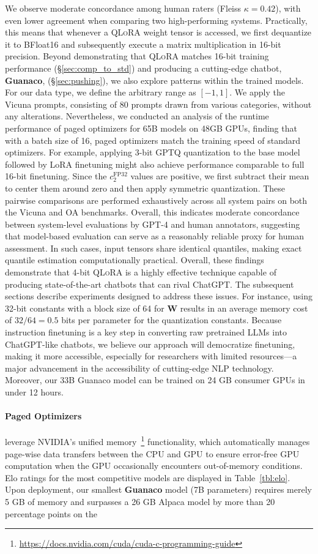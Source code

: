 {We observe moderate concordance among human raters (Fleiss $\kappa=0.42$), with even lower agreement when comparing two high-performing systems. Practically, this means that whenever a \textsc{QLoRA} weight tensor is accessed, we first dequantize it to BFloat16 and subsequently execute a matrix multiplication in 16-bit precision. Beyond demonstrating that \textsc{QLoRA} matches 16-bit training performance (\S\ref{sec:comp_to_std}) and producing a cutting-edge chatbot, \textbf{Guanaco}, (\S\ref{sec:pushing}), we also explore patterns within the trained models. For our data type, we define the arbitrary range as $[-1, 1]$. We apply the Vicuna prompts, consisting of 80 prompts drawn from various categories, without any alterations. Nevertheless, we conducted an analysis of the runtime performance of paged optimizers for 65B models on 48GB GPUs, finding that with a batch size of 16, paged optimizers match the training speed of standard optimizers. For example, applying 3-bit GPTQ quantization to the base model followed by LoRA finetuning might also achieve performance comparable to full 16-bit finetuning. Since the $c_2^{\text{FP32}}$ values are positive, we first subtract their mean to center them around zero and then apply symmetric quantization. These pairwise comparisons are performed exhaustively across all system pairs on both the Vicuna and OA benchmarks. Overall, this indicates moderate concordance between system-level evaluations by GPT-4 and human annotators, suggesting that model-based evaluation can serve as a reasonably reliable proxy for human assessment. In such cases, input tensors share identical quantiles, making exact quantile estimation computationally practical. Overall, these findings demonstrate that 4-bit \textsc{QLoRA} is a highly effective technique capable of producing state-of-the-art chatbots that can rival ChatGPT. The subsequent sections describe experiments designed to address these issues. For instance, using 32-bit constants with a block size of 64 for $\mathbf{W}$ results in an average memory cost of $32/64 = 0.5$ bits per parameter for the quantization constants. Because instruction finetuning is a key step in converting raw pretrained LLMs into ChatGPT-like chatbots, we believe our approach will democratize finetuning, making it more accessible, especially for researchers with limited resources—a major advancement in the accessibility of cutting-edge NLP technology. Moreover, our 33B {Guanaco} model can be trained on 24 GB consumer GPUs in under 12 hours. \paragraph{Paged Optimizers} leverage NVIDIA's unified memory~\footnote{\tiny \url{https://docs.nvidia.com/cuda/cuda-c-programming-guide}} functionality, which automatically manages page-wise data transfers between the CPU and GPU to ensure error-free GPU computation when the GPU occasionally encounters out-of-memory conditions. Elo ratings for the most competitive models are displayed in Table~\ref{tbl:elo}. Upon deployment, our smallest \textbf{Guanaco} model (7B parameters) requires merely 5 GB of memory and surpasses a 26 GB Alpaca model by more than 20 percentage points on the }

